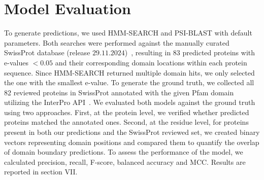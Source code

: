 
\section{Model Evaluation}

To generate predictions, we used HMM-SEARCH and PSI-BLAST with default parameters. Both searches were performed against the manually curated SwissProt database (release $29.11.2024$)~\cite{uniprot}, resulting in $83$ predicted proteins with e-values $< 0.05$ and their corresponding domain locations within each protein sequence. Since HMM-SEARCH returned multiple domain hits, we only selected the one with the smallest e-value. To generate the ground truth, we collected all 82 reviewed proteins in SwissProt annotated with the given Pfam domain~\cite{pfam} utilizing the InterPro API~\cite{interpro}. We evaluated both models against the ground truth using two approaches. First, at the protein level, we verified whether predicted proteins matched the annotated ones. Second, at the residue level, for proteins present in both our predictions and the SwissProt reviewed set, we created binary vectors representing domain positions and compared them to quantify the overlap of domain boundary predictions. To assess the performance of the model, we calculated precision, recall, F-score, balanced accuracy and MCC. Results are reported in section VII.






